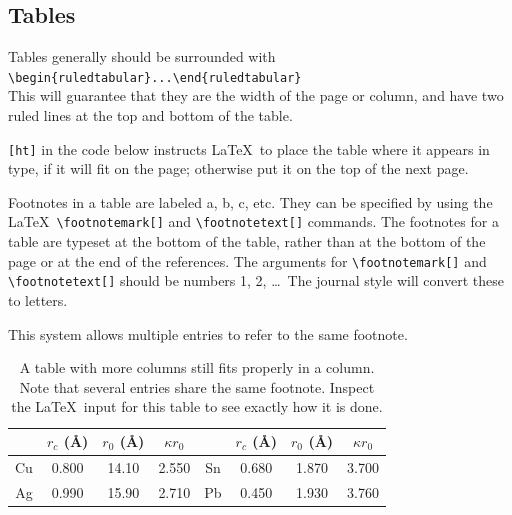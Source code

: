 \documentclass[reprint]{JASAnew}
\begin{document}
\subsection{\label{subsec:3:2} Tables}
Tables generally should be surrounded with
\verb+\begin{ruledtabular}...\end{ruledtabular}+\\
This will guarantee that they are the width of the
page or column, and have two ruled lines at the top
and bottom of the table.

\verb+[ht]+ in the code below instructs \LaTeX\ to place the table
where it appears in type, if it will fit on the page;
otherwise put it on the top of the next page.

Footnotes in a table are labeled a, b, c,
 etc.  They can
be  specified  by  using  the  \LaTeX\
\verb+\footnotemark[]+
and
\verb+\footnotetext[]+ commands.
The  footnotes  for  a  table  are  typeset  at  the
bottom  of  the  table,  rather  than  at  the  bottom  of  the
page or at the end of the references.  The arguments for
\verb+\footnotemark[]+
and
\verb+\footnotetext[]+
should be numbers
1, 2, \ldots\  The journal style will convert these to letters.

This system allows
multiple entries to refer to the same
footnote.   


\begin{table}[ht]
\caption{\label{tab:table1}A table with more columns still fits
properly in a column. Note that several entries share the same
footnote. Inspect the \LaTeX\ input for this table to see
exactly how it is done.}

\begin{ruledtabular}
\begin{tabular}{cccccccc}
 &$r_c$ (\AA)\footnotemark[1]&$r_0$ (\AA)&$\kappa r_0$&
 &$r_c$ (\AA) &$r_0$ (\AA)&$\kappa r_0$\\
\hline
Cu& 0.800 & 14.10 & 2.550 &Sn\footnotemark[1]
& 0.680 & 1.870 & 3.700 \\
Ag& 0.990 & 15.90 & 2.710 &Pb\footnotemark[2]
& 0.450 & 1.930 & 3.760 \\
\end{tabular}
\end{ruledtabular}
\end{table}
\end{document}
